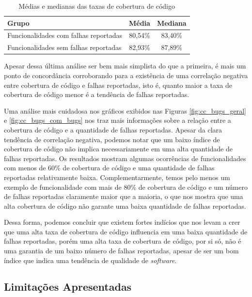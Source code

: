 \documentclass[11.5pt]{article}
\begin{document}
\begin{table}[ht]
\centering
\caption{Médias e medianas das taxas de cobertura de código}
\label{tab:mediasMedianasCC}
\begin{tabular}{|l|c|c|}
\hline
\textbf{Grupo}                        & \textbf{Média} & \textbf{Mediana} \\ \hline
Funcionalidades com falhas reportadas & 80,54\% & 83,40\%  \\ \hline
Funcionalidades sem falhas reportadas & 82,93\% & 87,89\%  \\ \hline
\end{tabular}
\end{table}

Apesar dessa última análise ser bem mais simplista do que a primeira, é mais um ponto de
concordância corroborando para a existência de uma correlação negativa entre cobertura de código
e falhas reportadas, isto é, quanto maior a taxa de cobertura de código menor é a tendência de
falhas reportadas.

Uma análise mais cuidadosa nos gráficos exibidos nas Figuras \ref{fig:cc_bugs_geral} e
\ref{fig:cc_bugs_com_bugs} nos traz mais informações sobre a relação entre a cobertura de código e a
quantidade de falhas reportadas.
Apesar da clara tendência de correlação negativa, podemos notar que um baixo índice de cobertura de
código não implica necessariamente em uma alta quantidade de falhas reportadas. Os resultados
mostram algumas ocorrências de funcionalidades com menos de 60\% de cobertura de código e uma
quantidade de falhas reportadas relativamente baixa.
Complementarmente, temos pelo menos um exemplo de funcionalidade com mais de 80\% de cobertura de
código e um número de falhas reportadas claramente maior que a maioria, o que nos mostra que uma
alta cobertura de código não garante uma baixa quantidade de falhas reportadas.

Dessa forma, podemos concluir que existem fortes indícios que nos levam a crer que uma alta taxa de
cobertura de código influencia em uma baixa quantidade de falhas reportadas, porém uma alta taxa de
cobertura de código, por si só, não é uma garantia de um baixo número de falhas reportadas, apesar
de ser um bom índice que indica uma tendência de qualidade de \textit{software}.


\subsection{Limitações Apresentadas}
\end{document}
